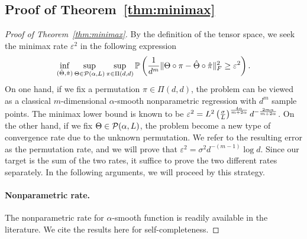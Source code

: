 \documentclass[12pt]{article}
\theoremstyle{definition}
\begin{document}
\subsection{Proof of Theorem~\ref{thm:minimax}}
\begin{proof}[Proof of Theorem~\ref{thm:minimax}] By the definition of the tensor space, we seek the minimax rate $\varepsilon^2$ in the following expression
\begin{equation}\label{eq:final}
\inf_{(\hat \Theta,\hat \pi)}\sup_{\Theta\in \mathcal{P}(\alpha,L)}\sup_{\pi\in\Pi(d,d)} \mathbb{P}\left({1\over d^m}\lVert\Theta\circ \pi-\hat \Theta\circ \hat \pi\rVert_F^2 \geq \varepsilon^2 \right).
\end{equation}
On one hand, if we fix a permutation $\pi\in\Pi(d,d)$, the problem can be viewed as a classical $m$-dimensional $\alpha$-smooth nonparametric regression with $d^m$ sample points. The minimax lower bound is known to be $\varepsilon^2=L^2\left(\sigma\over L\right)^{4\alpha\over m+2\alpha}d^{-{2m\alpha\over m+2\alpha}}$. On the other hand, if we fix $\Theta\in\mathcal{P}(\alpha,L)$, the problem become a new type of convergence rate due to the unknown permutation. We refer to the resulting error as the permutation rate, and we will prove that $\varepsilon^2=\sigma^2 d^{-(m-1)}\log d$. Since our target is the sum of the two rates, it suffice to prove the two different rates separately. In the following arguments, we will proceed by this strategy. 

\paragraph{Nonparametric rate.} The nonparametric rate for $\alpha$-smooth function is readily available in the literature. We cite the results here for self-completeness. 


\end{proof}
\end{document}
